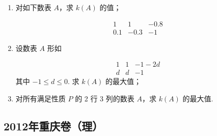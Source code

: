 \begin{description}
\begin{enumerate}[leftmargin=5pt]
\begin{enumerate}
\item 对如下数表 \(A\)，求 \(k(A)\) 的值；

\[
\begin{array}{ccc}

1 & 1 & -0.8 \\
0.1 & -0.3 & -1

\end{array}
\]\item 设数表 \(A\) 形如

\[
\begin{array}{ccc}

1 & 1 & -1 - 2d \\
d & d & -1

\end{array}
\]其中 \(-1 \leqslant d \leqslant 0\). 求 \(k(A)\) 的最大值；
\item 对所有满足性质 \(P\) 的 2 行 3 列的数表 \(A\)，求 \(k(A)\) 的最大值.
\end{enumerate}

    \end{enumerate}

\end{description}


\subsection{2012年重庆卷（理）}\label{gk:2012年重庆卷（理）}

